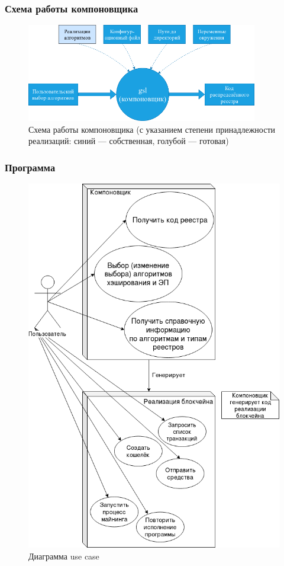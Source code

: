 \documentclass{beamer}
\begin{document}
\begin{frame}
    \frametitle{Схема работы компоновщика}
    \vspace{0.6cm}
    \begin{figure}
        \centering
        \includegraphics[width=0.9\textwidth]{komponovshik_color}
        \caption{\small \centering Схема работы компоновщика (с указанием
        степени принадлежности реализаций: синий --- собственная, голубой ---
        готовая)}
    \end{figure}
\end{frame}

\begin{frame}
    \frametitle{Программа}
    \begin{figure}
        \includegraphics[height=0.75\textheight]{uc}
        \caption{Диаграмма use case}
    \end{figure}
\end{frame}
\end{document}
